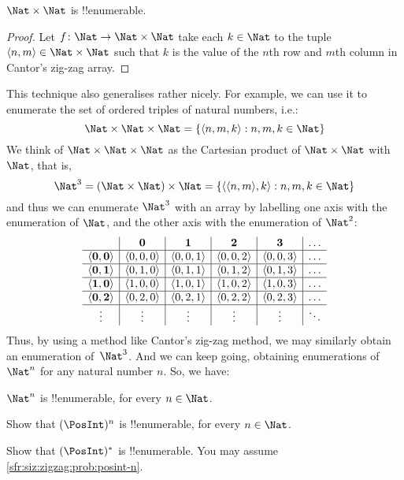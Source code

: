 \documentclass[../../../include/open-logic-section]{subfiles}
\begin{document}
\begin{prop}
$\Nat \times \Nat$ is !!{enumerable}.
\end{prop}

\begin{proof}
Let $f \colon \Nat \to \Nat\times\Nat$ take each $k \in \Nat$ to the
tuple $\tuple{n,m} \in \Nat \times \Nat$ such that $k$ is the value of
the $n$th row and $m$th column in Cantor's zig-zag array. 
\end{proof}

\begin{explain}
This technique also generalises rather nicely. For example, we can use
it to enumerate the set of ordered triples of natural numbers, i.e.:
\[
\Nat \times \Nat \times \Nat = \Setabs{\tuple{n,m,k}}{n,m,k \in \Nat}
\]
We think of $\Nat \times \Nat \times \Nat$ as the Cartesian
product of $\Nat \times \Nat$ with $\Nat$, that is,
\[
\Nat^3 = (\Nat \times \Nat) \times \Nat =
\Setabs{\tuple{\tuple{n,m},k}}{n, m, k
  \in \Nat }
\]
and thus we can enumerate $\Nat^3$ with an array by labelling one
axis with the enumeration of $\Nat$, and the other axis with the
enumeration of $\Nat^2$:
\[
\begin{array}{ c | c | c | c | c | c}
& \mathbf 0 & \mathbf 1 & \mathbf 2 & \mathbf 3 & \dots \\
\hline
\mathbf{\tuple{0,0}} & \tuple{0,0,0} & \tuple{0,0,1} & \tuple{0,0,2} & \tuple{0,0,3} & \dots \\
\hline
\mathbf{\tuple{0,1}} & \tuple{0,1,0} & \tuple{0,1,1} & \tuple{0,1,2} & \tuple{0,1,3} & \dots \\
\hline
\mathbf{\tuple{1,0}} & \tuple{1,0,0} & \tuple{1,0,1} & \tuple{1,0,2} & \tuple{1,0,3} & \dots \\
\hline
\mathbf{\tuple{0,2}} & \tuple{0,2,0} & \tuple{0,2,1} & \tuple{0,2,2} & \tuple{0,2,3} & \dots\\
\hline
\vdots & \vdots & \vdots & \vdots & \vdots & \ddots \\
\end{array}
\]
Thus, by using a method like Cantor's zig-zag method, we may similarly
obtain an enumeration of~$\Nat^3$. And we can keep going, obtaining
enumerations of $\Nat^n$ for any natural number $n$. So, we have:
\end{explain}

\begin{prop}
$\Nat^n$ is !!{enumerable}, for every $n \in \Nat$.
\end{prop}

\begin{prob}\label{sfr:siz:zigzag:prob:posint-n}
Show that $(\PosInt)^n$ is !!{enumerable}, for every $n \in \Nat$.
\end{prob}

\begin{prob}\label{sfr:siz:zigzag:prob:posint-star}
  Show that $(\PosInt)^*$ is !!{enumerable}. You may assume \cref{sfr:siz:zigzag:prob:posint-n}.
\end{prob}
\end{document}
